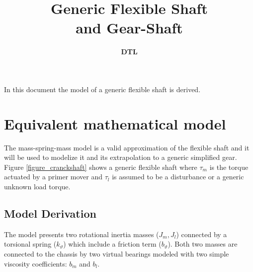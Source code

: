 \documentclass[11pt,a4paper]{article}
\title{\textbf{Generic Flexible Shaft \\ and Gear-Shaft}}
\author{\textbf{DTL}}
\numberwithin{equation}{section}
\theoremstyle{it}
\theoremstyle{definition}
\begin{document}
	\thispagestyle{firstpage}
	\begin{mybox}
		\maketitle
		\vspace{125mm}
	\end{mybox}
	\newpage
	\tableofcontents
	\listoffigures	
	\listoftables
	\newpage

{In this document the model of a generic flexible shaft is derived.}


\section{Equivalent mathematical model}
The mass-spring-mass model is a valid approximation of the flexible shaft and it will be used to modelize it and its extrapolation to a generic simplified gear.
Figure \ref{figure_cranckshaft} shows a generic flexible shaft where $\tau_m$ 
is the torque actuated by a primer mover and $\tau_l$ is assumed to be a disturbance or a generic unknown load 
torque.
\subsection{Model Derivation} 
The model presents two rotational inertia masses ($J_m, J_l$) connected by a torsional spring ($k_{\vartheta}$) which include a friction term ($b_{\vartheta}$). Both two masses are connected to the chassis by two virtual bearings modeled with two simple viscosity coefficients: $b_m$ and $b_l$.
\end{document}
